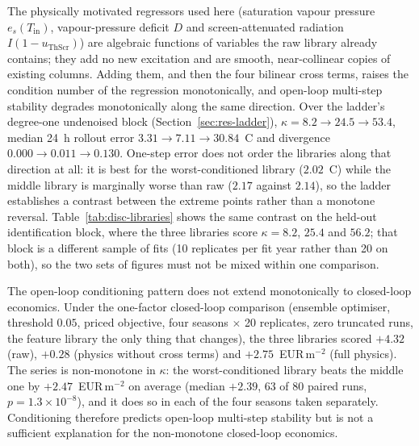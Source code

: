 The physically motivated regressors used here (saturation vapour pressure $e_s(T_{\text{in}})$, vapour-pressure deficit $D$ and screen-attenuated radiation $I(1-u_{\text{ThScr}})$) are algebraic functions of variables the raw
library already contains; they add no new excitation and are smooth, near-collinear
copies of existing columns. Adding them, and then the four bilinear cross terms, raises
the condition number of the regression monotonically, and open-loop multi-step
stability degrades monotonically along the same direction. Over the ladder's
degree-one undenoised block (Section~\ref{sec:res-ladder}),
$\kappa = 8.2 \rightarrow 24.5 \rightarrow 53.4$, median 24~h rollout error
$3.31 \rightarrow 7.11 \rightarrow 30.84$~\textdegree C and divergence
$0.000 \rightarrow 0.011 \rightarrow 0.130$. One-step error does not order the
libraries along that direction at all: it is best for the worst-conditioned
library ($2.02$~\textdegree C) while the middle library is marginally worse than
raw ($2.17$ against $2.14$), so the ladder establishes a contrast between the extreme
points rather than a monotone reversal.
Table~\ref{tab:disc-libraries} shows the same contrast on the held-out
identification block, where the three libraries score $\kappa = 8.2$, $25.4$ and
$56.2$; that block is a different sample of fits (10 replicates per fit year
rather than 20 on both), so the two sets of figures must not be mixed within one
comparison.

The open-loop conditioning pattern does not extend monotonically to closed-loop
economics. Under the one-factor closed-loop comparison (ensemble optimiser,
threshold $0.05$, priced objective, four seasons
$\times$ 20 replicates, zero truncated runs, the feature library the only thing
that changes), the three libraries scored $+4.32$ (raw), $+0.28$ (physics without
cross terms) and $+2.75$~EUR\,m$^{-2}$ (full physics). The series is
non-monotone in $\kappa$: the worst-conditioned library beats the middle
one by $+2.47$~EUR\,m$^{-2}$ on average (median $+2.39$, 63 of 80 paired runs,
$p=1.3\times10^{-8}$), and it does so in each of the four seasons taken
separately.
Conditioning therefore predicts open-loop multi-step stability but is not a
sufficient explanation for the non-monotone closed-loop economics.

